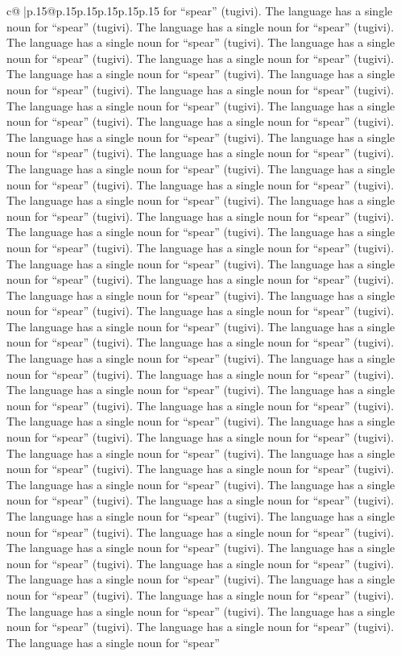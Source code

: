 \documentclass{article}
\begin{document}
{\begin{supertabular}{c@{$\;$}|p{.15\linewidth}@{}p{.15\linewidth}p{.15\linewidth}p{.15\linewidth}p{.15\linewidth}p{.15\linewidth}}
{{{for “spear” (tugivi). The language has a single noun for “spear” (tugivi). The language has a single noun for “spear” (tugivi). The language has a single noun for “spear” (tugivi). The language has a single noun for “spear” (tugivi). The language has a single noun for “spear” (tugivi). The language has a single noun for “spear” (tugivi). The language has a single noun for “spear” (tugivi). The language has a single noun for “spear” (tugivi). The language has a single noun for “spear” (tugivi). The language has a single noun for “spear” (tugivi). The language has a single noun for “spear” (tugivi). The language has a single noun for “spear” (tugivi). The language has a single noun for “spear” (tugivi). The language has a single noun for “spear” (tugivi). The language has a single noun for “spear” (tugivi). The language has a single noun for “spear” (tugivi). The language has a single noun for “spear” (tugivi). The language has a single noun for “spear” (tugivi). The language has a single noun for “spear” (tugivi). The language has a single noun for “spear” (tugivi). The language has a single noun for “spear” (tugivi). The language has a single noun for “spear” (tugivi). The language has a single noun for “spear” (tugivi). The language has a single noun for “spear” (tugivi). The language has a single noun for “spear” (tugivi). The language has a single noun for “spear” (tugivi). The language has a single noun for “spear” (tugivi). The language has a single noun for “spear” (tugivi). The language has a single noun for “spear” (tugivi). The language has a single noun for “spear” (tugivi). The language has a single noun for “spear” (tugivi). The language has a single noun for “spear” (tugivi). The language has a single noun for “spear” (tugivi). The language has a single noun for “spear” (tugivi). The language has a single noun for “spear” (tugivi). The language has a single noun for “spear” (tugivi). The language has a single noun for “spear” (tugivi). The language has a single noun for “spear” (tugivi). The language has a single noun for “spear” (tugivi). The language has a single noun for “spear” (tugivi). The language has a single noun for “spear” (tugivi). The language has a single noun for “spear” (tugivi). The language has a single noun for “spear” (tugivi). The language has a single noun for “spear” (tugivi). The language has a single noun for “spear” (tugivi). The language has a single noun for “spear” (tugivi). The language has a single noun for “spear” (tugivi). The language has a single noun for “spear” (tugivi). The language has a single noun for “spear” (tugivi). The language has a single noun for “spear” (tugivi). The language has a single noun for “spear” (tugivi). The language has a single noun for “spear” (tugivi). The language has a single noun for “spear” (tugivi). The language has a single noun for “spear” (tugivi). The language has a single noun for “spear” (tugivi). The language has a single noun for “spear” (tugivi). The language has a single noun for “spear” (tugivi). The language has a single noun for “spear” (tugivi). The language has a single noun for “spear” (tugivi). The language has a single noun for “spear” }}}
\end{supertabular}}
\end{document}
